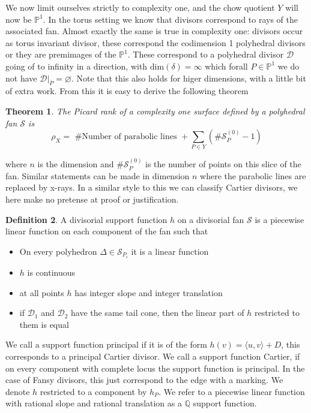 \documentclass[12pt,a4paper]{book}      %
\newtheorem{thm}{Theorem}[section]
\theoremstyle{definition}
\newtheorem{dfn}[thm]{Definition}
\begin{document}
We now limit ourselves strictly to complexity one, and the chow quotient $Y$ will now be $\mathbb{P}^1$. In the torus setting we know that divisors correspond to rays of the associated fan. Almost exactly the same is true in complexity one: divisors  occur as torus invariant divisor, these correspond the codimension 1 polyhedral divisors or they are premimages of the $\mathbb{P}^1$. These correspond to a polyhedral divisor $\mathcal{D}$  going of to infinity in a direction, with dim$(\delta) = \infty$ which forall $P \in \mathbb{P}^1$ we do not have $\mathcal{D}  |_P = \varnothing$. Note that this also holds for higer dimensions, with a little bit of extra work. From this it is easy to derive the following theorem
\\
\begin{thm}\cite{Suss}
The Picard rank of a complexity one surface defined by a polyhedral fan $\mathcal{S}$ is 
\[
\rho_X =  \text{ \# Number of parabolic lines } + \sum_{P \in Y} (\# \mathcal{S}_P^{(0)} - 1) 
\]
\end{thm}
where $n$ is the dimension and $\# \mathcal{S}_P^{(0)}$ is the number of points on this slice of the fan. Similar statements can be made in dimension $n$ where the parabolic lines are replaced by x-rays. In a similar style to this we can classify Cartier divisors, we here make no pretense at proof or justification. 
\begin{dfn}
A divisorial support function $h$ on a divisorial fan $\mathcal{S}$ is a piecewise linear function on each component of the fan such that

\begin{itemize}
\item On every polyhedron $\Delta \in \mathcal{S}_{P_i}$ it is a linear function
\item $h$ is continuous
\item at all points $h$ has integer slope and integer translation
\item if $\mathcal{D}_1$ and $\mathcal{D}_2$ have the same tail cone, then the linear part of $h$ restricted to them is equal
\end{itemize}
\end{dfn}
We call a support function principal if it is of the form $h(v) = \langle u, v \rangle + D$, this corresponds to a principal Cartier divisor. We call a support function Cartier, if on every component with complete locus the support function is principal. In the case of Fansy divisors, this just correspond to the edge with a marking. We denote $h$ restricted to a component by $h_P$.  We refer to a piecewise linear function with rational slope and rational translation as a $\mathbb{Q}$ support function.
\end{document}

